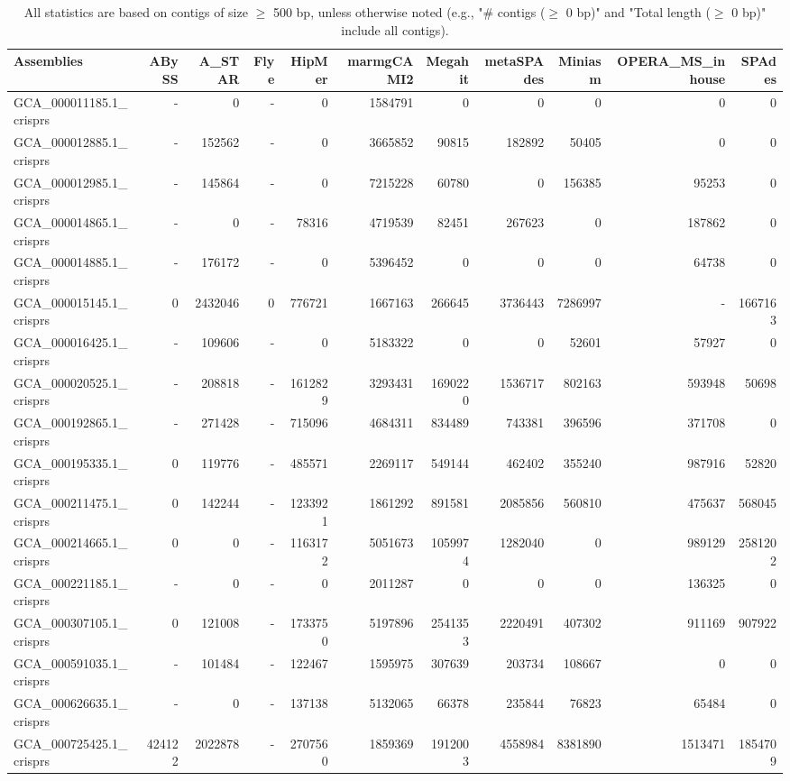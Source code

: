 \documentclass[12pt,a4paper]{article}
\begin{document}
\begin{table}[ht]
\begin{center}
\caption{All statistics are based on contigs of size $\geq$ 500 bp, unless otherwise noted (e.g., "\# contigs ($\geq$ 0 bp)" and "Total length ($\geq$ 0 bp)" include all contigs).}
\begin{tabular}{|l*{10}{|r}|}
\hline
Assemblies & ABySS & A\_STAR & Flye & HipMer & marmgCAMI2 & Megahit & metaSPAdes & Miniasm & OPERA\_MS\_inhouse & SPAdes \\ \hline
GCA\_000011185.1\_crisprs & - & 0 & - & 0 & 1584791 & 0 & 0 & 0 & 0 & 0 \\ \hline
GCA\_000012885.1\_crisprs & - & 152562 & - & 0 & 3665852 & 90815 & 182892 & 50405 & 0 & 0 \\ \hline
GCA\_000012985.1\_crisprs & - & 145864 & - & 0 & 7215228 & 60780 & 0 & 156385 & 95253 & 0 \\ \hline
GCA\_000014865.1\_crisprs & - & 0 & - & 78316 & 4719539 & 82451 & 267623 & 0 & 187862 & 0 \\ \hline
GCA\_000014885.1\_crisprs & - & 176172 & - & 0 & 5396452 & 0 & 0 & 0 & 64738 & 0 \\ \hline
GCA\_000015145.1\_crisprs & 0 & 2432046 & 0 & 776721 & 1667163 & 266645 & 3736443 & 7286997 & - & 1667163 \\ \hline
GCA\_000016425.1\_crisprs & - & 109606 & - & 0 & 5183322 & 0 & 0 & 52601 & 57927 & 0 \\ \hline
GCA\_000020525.1\_crisprs & - & 208818 & - & 1612829 & 3293431 & 1690220 & 1536717 & 802163 & 593948 & 50698 \\ \hline
GCA\_000192865.1\_crisprs & - & 271428 & - & 715096 & 4684311 & 834489 & 743381 & 396596 & 371708 & 0 \\ \hline
GCA\_000195335.1\_crisprs & 0 & 119776 & - & 485571 & 2269117 & 549144 & 462402 & 355240 & 987916 & 52820 \\ \hline
GCA\_000211475.1\_crisprs & 0 & 142244 & - & 1233921 & 1861292 & 891581 & 2085856 & 560810 & 475637 & 568045 \\ \hline
GCA\_000214665.1\_crisprs & 0 & 0 & - & 1163172 & 5051673 & 1059974 & 1282040 & 0 & 989129 & 2581202 \\ \hline
GCA\_000221185.1\_crisprs & - & 0 & - & 0 & 2011287 & 0 & 0 & 0 & 136325 & 0 \\ \hline
GCA\_000307105.1\_crisprs & 0 & 121008 & - & 1733750 & 5197896 & 2541353 & 2220491 & 407302 & 911169 & 907922 \\ \hline
GCA\_000591035.1\_crisprs & - & 101484 & - & 122467 & 1595975 & 307639 & 203734 & 108667 & 0 & 0 \\ \hline
GCA\_000626635.1\_crisprs & - & 0 & - & 137138 & 5132065 & 66378 & 235844 & 76823 & 65484 & 0 \\ \hline
GCA\_000725425.1\_crisprs & 424122 & 2022878 & - & 2707560 & 1859369 & 1912003 & 4558984 & 8381890 & 1513471 & 1854709 \\ \hline
\end{tabular}
\end{center}
\end{table}
\end{document}
